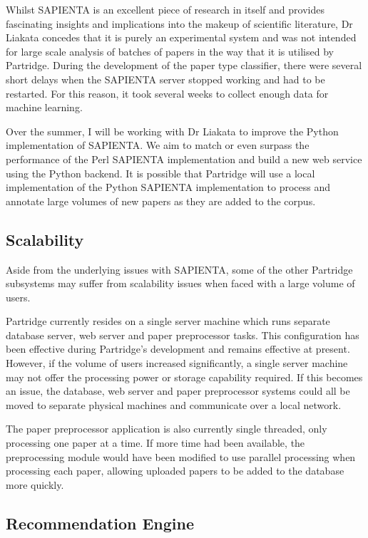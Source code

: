 Whilst SAPIENTA is an excellent piece of research in itself and provides
fascinating insights and implications into the makeup of scientific literature,
Dr Liakata concedes that it is purely an experimental system and was not
intended for large scale analysis of batches of papers in the way that it is
utilised by Partridge. During the development of the paper type classifier,
there were several short delays when the SAPIENTA server stopped working and
had to be restarted. For this reason, it took several weeks to collect enough
data for machine learning. 

Over the summer, I will be working with Dr Liakata to improve the Python
implementation of SAPIENTA. We aim to match or even surpass the performance of
the Perl SAPIENTA implementation and build a new web service using the Python
backend. It is possible that Partridge will use a local implementation of the
Python SAPIENTA implementation to process and annotate large volumes of new
papers as they are added to the corpus.

\subsection{ Scalability }

Aside from the underlying issues with SAPIENTA, some of the other Partridge
subsystems may suffer from scalability issues when faced with a large volume of
users. 

Partridge currently resides on a single server machine which runs separate
database server, web server and paper preprocessor tasks. This configuration
has been effective during Partridge's development and remains effective at
present. However, if the volume of users increased significantly, a single
server machine may not offer the processing power or storage capability
required. If this becomes an issue, the database, web server and paper
preprocessor systems could all be moved to separate physical machines and
communicate over a local network.

The paper preprocessor application is also currently single threaded, only
processing one paper at a time. If more time had been available, the
preprocessing module would have been modified to use parallel processing when
processing each paper, allowing uploaded papers to be added to the database more
quickly.

\subsection{ Recommendation Engine}

